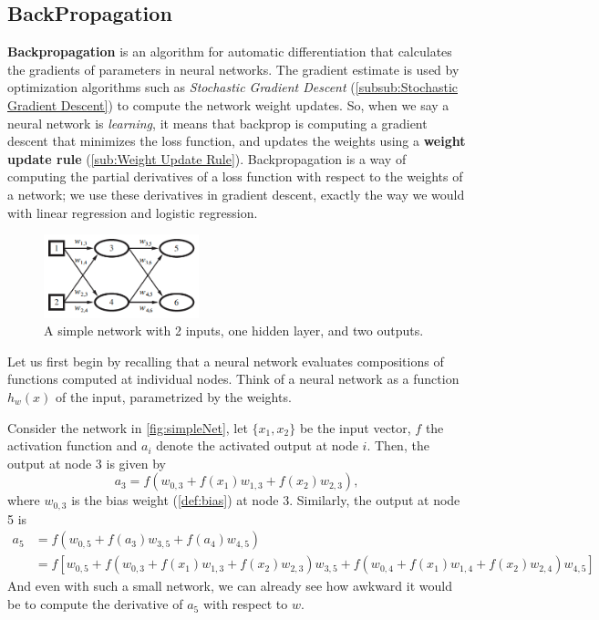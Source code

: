 \documentclass{article}
\begin{document}
\subsection{BackPropagation}%
  \label{sub:BackPropagation}
\textbf{Backpropagation} is an algorithm for automatic differentiation that calculates the gradients of parameters in neural networks. The gradient estimate is used by optimization algorithms such as \textit{Stochastic Gradient Descent} (\autoref{subsub:Stochastic Gradient Descent}) to compute the network weight updates. So, when we say a neural network is \textit{learning}, it means that backprop is computing a gradient descent that minimizes the loss function, and updates the weights using a \textbf{weight update rule} (\autoref{sub:Weight Update Rule}). Backpropagation is a way of computing the partial derivatives of a loss function with respect to the weights of a network; we use these derivatives in gradient descent, exactly the way we would with linear regression and logistic regression. 
\begin{figure} %
    \centering
    \includegraphics[width=0.4\textwidth]{simpleNet}
    \caption{A simple network with 2 inputs, one hidden layer, and two outputs.}
    \label{fig:simpleNet}
\end{figure}
  Let us first begin by recalling that a neural network evaluates compositions of functions computed at individual nodes. Think of a neural network as a function $h_w(x)$ of the input, parametrized by the weights. 
\begin{example}[]
   Consider the network in \autoref{fig:simpleNet}, let $\{x_1,x_2\}$ be the input vector, $f$ the activation function and $a_i$ denote the activated output at node $i$. Then, the output at node 3 is given by
  $$a_3 = f(w_{0, 3} + f(x_1)w_{1,3} + f(x_2)w_{2,3}), $$
  where $w_{0,3}$ is the bias weight (\autoref{def:bias}) at node 3. Similarly, the output at node 5 is
  \begin{equation*}
    \begin{split}
      a_5 &= f( w_{0,5} + f(a_3) w_{3,5} + f(a_4) w_{4,5}  )\\ 
      &= f[w_{0,5} + f(w_{0, 3} + f(x_1)w_{1,3} + f(x_2)w_{2,3})w_{3,5} +f(w_{0, 4} + f(x_1)w_{1,4} + f(x_2)w_{2,4})w_{4,5} ]
    \end{split}
  \end{equation*}
  And even with such a small network, we can already see how awkward it would be to compute the derivative of $a_5$ with respect to $w$. 
\end{example}
\end{document}
